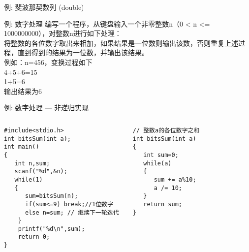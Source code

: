 \begin{frame}{例: 斐波那契数列 (double)}
\vspace{-0.3cm}
\end{frame}

\begin{frame}{例: 数字处理}
编写一个程序，从键盘输入一个非零整数n（0 < n <= 1000000000），对整数n进行如下处理：\\
将整数的各位数字取出来相加，如果结果是一位数则输出该数，否则重复上述过程，直到得到的结果为一位数，并输出该结果。\\
例如：n=456，变换过程如下\\
4+5+6=15\\
1+5=6\\
输出结果为6
\end{frame}

\begin{frame}{例: 数字处理 --- 非递归实现}
\vspace{-0.3cm}
\begin{columns}[T]
\begin{lstlisting}
#include<stdio.h>
int bitsSum(int a);
int main()
{
   int n,sum;
   scanf("%d",&n);
   while(1)
   {
      sum=bitsSum(n);
      if(sum<=9) break;//1位数字
      else n=sum; // 继续下一轮迭代 
    }
    printf("%d\n",sum); 
    return 0;
}
\end{lstlisting}
\begin{lstlisting}[frame=leftline]
// 整数a的各位数字之和
int bitsSum(int a)
{
   int sum=0;
   while(a)
   {
      sum += a%10;
      a /= 10;
   }
   return sum;
}
\end{lstlisting}
\end{columns}
~\\
\end{frame}

